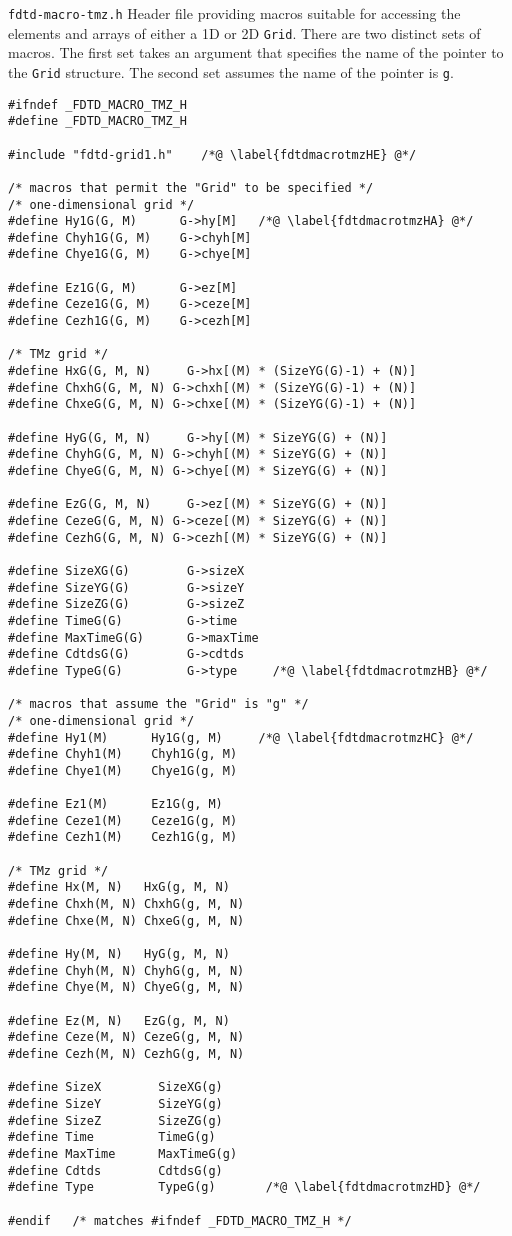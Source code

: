\begin{program}
{\tt fdtd-macro-tmz.h} Header file providing macros suitable for
accessing the elements and arrays of either a 1D or 2D {\tt Grid}.
There are two distinct sets of macros.  The first set takes an
argument that specifies the name of the pointer to the {\tt Grid}
structure.  The second set assumes the name of the pointer is {\tt g}.
\label{pro:fdtdmacrotmzh}
\codemiddle
\begin{lstlisting}
#ifndef _FDTD_MACRO_TMZ_H
#define _FDTD_MACRO_TMZ_H

#include "fdtd-grid1.h"    /*@ \label{fdtdmacrotmzHE} @*/

/* macros that permit the "Grid" to be specified */
/* one-dimensional grid */
#define Hy1G(G, M)      G->hy[M]   /*@ \label{fdtdmacrotmzHA} @*/
#define Chyh1G(G, M)    G->chyh[M]
#define Chye1G(G, M)    G->chye[M]

#define Ez1G(G, M)      G->ez[M]
#define Ceze1G(G, M)    G->ceze[M]
#define Cezh1G(G, M)    G->cezh[M]

/* TMz grid */
#define HxG(G, M, N)     G->hx[(M) * (SizeYG(G)-1) + (N)]
#define ChxhG(G, M, N) G->chxh[(M) * (SizeYG(G)-1) + (N)]
#define ChxeG(G, M, N) G->chxe[(M) * (SizeYG(G)-1) + (N)]

#define HyG(G, M, N)     G->hy[(M) * SizeYG(G) + (N)]
#define ChyhG(G, M, N) G->chyh[(M) * SizeYG(G) + (N)]
#define ChyeG(G, M, N) G->chye[(M) * SizeYG(G) + (N)]

#define EzG(G, M, N)     G->ez[(M) * SizeYG(G) + (N)]
#define CezeG(G, M, N) G->ceze[(M) * SizeYG(G) + (N)]
#define CezhG(G, M, N) G->cezh[(M) * SizeYG(G) + (N)]

#define SizeXG(G)        G->sizeX
#define SizeYG(G)        G->sizeY
#define SizeZG(G)        G->sizeZ
#define TimeG(G)         G->time
#define MaxTimeG(G)      G->maxTime
#define CdtdsG(G)        G->cdtds
#define TypeG(G)         G->type     /*@ \label{fdtdmacrotmzHB} @*/

/* macros that assume the "Grid" is "g" */
/* one-dimensional grid */
#define Hy1(M)      Hy1G(g, M)     /*@ \label{fdtdmacrotmzHC} @*/
#define Chyh1(M)    Chyh1G(g, M)
#define Chye1(M)    Chye1G(g, M)

#define Ez1(M)      Ez1G(g, M)
#define Ceze1(M)    Ceze1G(g, M)
#define Cezh1(M)    Cezh1G(g, M)

/* TMz grid */
#define Hx(M, N)   HxG(g, M, N)
#define Chxh(M, N) ChxhG(g, M, N)
#define Chxe(M, N) ChxeG(g, M, N) 

#define Hy(M, N)   HyG(g, M, N)
#define Chyh(M, N) ChyhG(g, M, N)
#define Chye(M, N) ChyeG(g, M, N)

#define Ez(M, N)   EzG(g, M, N)
#define Ceze(M, N) CezeG(g, M, N) 
#define Cezh(M, N) CezhG(g, M, N) 

#define SizeX        SizeXG(g)
#define SizeY        SizeYG(g)
#define SizeZ        SizeZG(g)
#define Time         TimeG(g)
#define MaxTime      MaxTimeG(g)
#define Cdtds        CdtdsG(g)
#define Type         TypeG(g)       /*@ \label{fdtdmacrotmzHD} @*/

#endif   /* matches #ifndef _FDTD_MACRO_TMZ_H */
\end{lstlisting}
\end{program}

